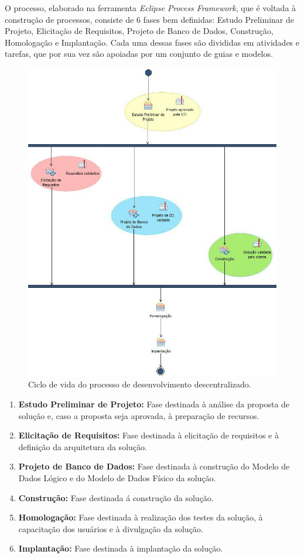 O processo, elaborado na ferramenta \textit{Eclipse Process Framework}, que é voltada à construção de processos, consiste de 6 fases bem definidas: Estudo Preliminar de Projeto, Elicitação de Requisitos, Projeto de Banco de Dados, Construção, Homologação e Implantação. Cada uma dessas fases são divididas em atividades e tarefas, que por sua vez são apoiadas por um conjunto de guias e modelos.

\begin{figure}[h]
	\centering
		\includegraphics[scale=0.8]{figuras/PDESC}
	\caption{Ciclo de vida do processo de desenvolvimento descentralizado.}
\end{figure}

\begin{enumerate}
	\item \textbf{Estudo Preliminar de Projeto:} Fase destinada à análise da proposta de solução e, caso a proposta seja aprovada, à preparação de recursos.
	\item \textbf{Elicitação de Requisitos:} Fase destinada à elicitação de requisitos e à definição da arquitetura da solução.
	\item \textbf{Projeto de Banco de Dados:} Fase destinada à construção do Modelo de Dados Lógico e do Modelo de Dados Físico da solução.
	\item \textbf{Construção:} Fase destinada á construção da solução.
	\item \textbf{Homologação:} Fase destinada à realização dos testes da solução, à capacitação dos usuários e à divulgação da solução.
	\item \textbf{Implantação:} Fase destinada à implantação da solução.
\end{enumerate}
\clearpage

